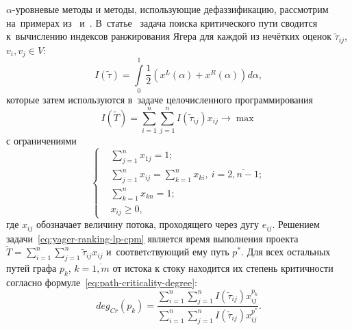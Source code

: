 $\alpha$-уровневые методы и методы, использующие дефаззификацию, рассмотрим на~примерах из~\cite{Indians_FCPM} и~\cite{Chinese_CPM}. В~статье~\cite{Chinese_CPM} задача поиска критического пути сводится к~вычислению индексов ранжирования Ягера для каждой из нечётких оценок $\tilde \tau_{ij}$, $v_i,v_j \in V$:
\begin{equation}
\label{eq:yager-ranking-lp-helper}
  I\left(\tilde \tau \right) = \int \limits_{0}^{1}{\frac{1}{2}\left(x^L \left(\alpha \right)+x^R \left(\alpha \right) \right) d\alpha},
\end{equation}
которые затем используются в~задаче целочисленного программирования
\begin{equation}
\label{eq:yager-ranking-lp-cpm}
  I \left( \tilde T \right) = \sum \limits_{i=1}^{n}\sum \limits_{j=1}^{n} I\left(\tilde \tau_{ij} \right)x_{ij} \to \max
\end{equation}
с ограничениями
\begin{equation}
\label{eq:lp-cpm-int-constraints}
  \left \{ \begin{aligned}
    & \sum \limits_{j=1}^n x_{1j}=1; \\
    & \sum \limits_{j=1}^n x_{ij}= \sum \limits_{k=1}^n x_{ki},\ i=\overline {2, n-1}; \\
    & \sum \limits_{k=1}^{n} x_{kn}=1; \\
    & x_{ij} \geqslant 0,
  \end{aligned} \right.
\end{equation}
где $x_{ij}$ обозначает величину потока, проходящего через дугу $e_{ij}$. Решением задачи~\eqref{eq:yager-ranking-lp-cpm} является время выполнения проекта $\displaystyle \tilde T = \sum \limits_{i=1}^{n} \sum \limits_{j=1}^{n} \tilde \tau_{ij} x_{ij}$ и~соответcтвующий ему путь $p^*$. Для всех остальных путей графа $p_k$, $k=\overline{1,m}$ от истока к стоку находится их степень критичности согласно формуле~\eqref{eq:path-criticality-degree}:
\begin{equation}
\label{eq:path-criticality-degree}
  deg_{Cr}\left(p_k \right) = \frac{\sum \limits_{i=1}^{n} \sum \limits_{j=1}^{n} I\left(\tilde \tau_{ij} \right) x_{ij}^{p_k}}{\sum \limits_{i=1}^{n} \sum \limits_{j=1}^{n} I\left( \tilde \tau_{ij} \right) x_{ij}^{p^*}}.
\end{equation}

